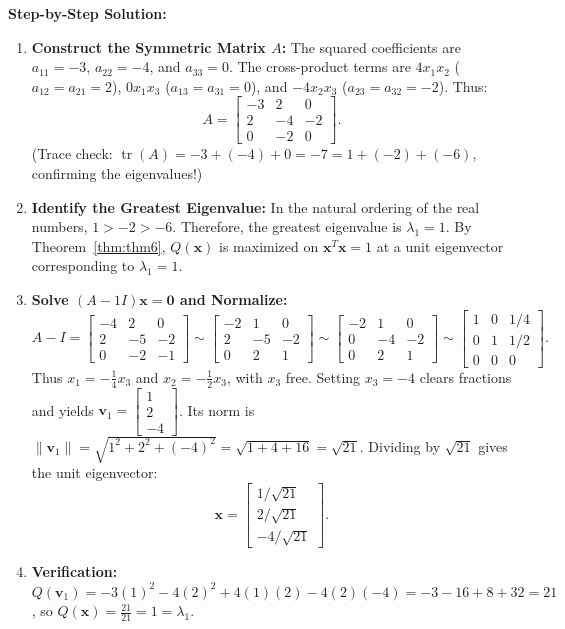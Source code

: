 \documentclass[11pt, letterpaper]{article}
\theoremstyle{definition}
\theoremstyle{remark}
\begin{document}
\textbf{Step-by-Step Solution:}
\begin{enumerate}[leftmargin=2em]
    \item \textbf{Construct the Symmetric Matrix $A$:}
    The squared coefficients are $a_{11} = -3$, $a_{22} = -4$, and $a_{33} = 0$. The cross-product terms are $4x_1 x_2$ ($a_{12} = a_{21} = 2$), $0x_1 x_3$ ($a_{13} = a_{31} = 0$), and $-4x_2 x_3$ ($a_{23} = a_{32} = -2$). Thus:
    \[
    A = \begin{bmatrix} -3 & 2 & 0 \\ 2 & -4 & -2 \\ 0 & -2 & 0 \end{bmatrix}.
    \]
    (Trace check: $\operatorname{tr}(A) = -3 + (-4) + 0 = -7 = 1 + (-2) + (-6)$, confirming the eigenvalues!)
    \item \textbf{Identify the Greatest Eigenvalue:}
    In the natural ordering of the real numbers, $1 > -2 > -6$. Therefore, the greatest eigenvalue is $\lambda_1 = 1$. By Theorem~\ref{thm:thm6}, $Q(\mathbf{x})$ is maximized on $\mathbf{x}^T \mathbf{x} = 1$ at a unit eigenvector corresponding to $\lambda_1 = 1$.
    \item \textbf{Solve $(A - 1I)\mathbf{x} = \mathbf{0}$ and Normalize:}
    \[
    A - I = \begin{bmatrix} -4 & 2 & 0 \\ 2 & -5 & -2 \\ 0 & -2 & -1 \end{bmatrix} \sim \begin{bmatrix} -2 & 1 & 0 \\ 2 & -5 & -2 \\ 0 & 2 & 1 \end{bmatrix} \sim \begin{bmatrix} -2 & 1 & 0 \\ 0 & -4 & -2 \\ 0 & 2 & 1 \end{bmatrix} \sim \begin{bmatrix} 1 & 0 & 1/4 \\ 0 & 1 & 1/2 \\ 0 & 0 & 0 \end{bmatrix}.
    \]
    Thus $x_1 = -\frac{1}{4}x_3$ and $x_2 = -\frac{1}{2}x_3$, with $x_3$ free. Setting $x_3 = -4$ clears fractions and yields $\mathbf{v}_1 = \begin{bmatrix} 1 \\ 2 \\ -4 \end{bmatrix}$. Its norm is $\|\mathbf{v}_1\| = \sqrt{1^2 + 2^2 + (-4)^2} = \sqrt{1 + 4 + 16} = \sqrt{21}$. Dividing by $\sqrt{21}$ gives the unit eigenvector:
    \[
    \mathbf{x} = \begin{bmatrix} 1/\sqrt{21} \\ 2/\sqrt{21} \\ -4/\sqrt{21} \end{bmatrix}.
    \]
    \item \textbf{Verification:} $Q(\mathbf{v}_1) = -3(1)^2 - 4(2)^2 + 4(1)(2) - 4(2)(-4) = -3 - 16 + 8 + 32 = 21$, so $Q(\mathbf{x}) = \frac{21}{21} = 1 = \lambda_1$.
\end{enumerate}
\end{document}
